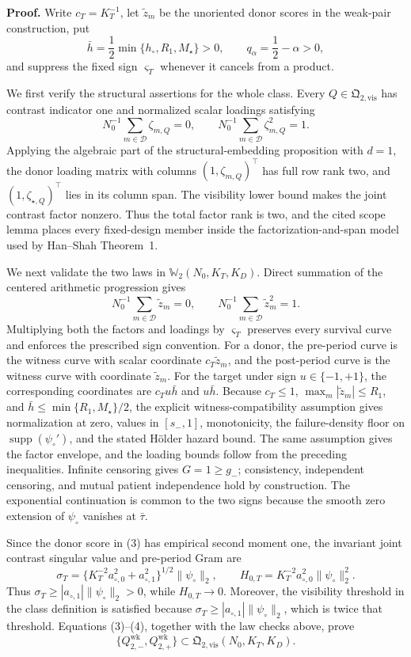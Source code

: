 \textbf{Proof.}
Write \(c_T=K_T^{-1}\), let \(\widetilde z_m\) be the unoriented donor scores in the weak-pair construction, put
\[
 \bar h=\frac12\min\{h_\circ,R_1,M_\star\}>0,
 \qquad q_\alpha=\frac12-\alpha>0,                       \tag{1}
\]
and suppress the fixed sign \(\varsigma_T\) whenever it cancels from a product.

We first verify the structural assertions for the whole class.  Every \(Q\in\mathfrak Q_{2,\mathrm{vis}}\) has contrast indicator one and normalized scalar loadings satisfying
\[
 N_0^{-1}\sum_{m\in\mathcal D}\zeta_{m,Q}=0,
 \qquad
 N_0^{-1}\sum_{m\in\mathcal D}\zeta_{m,Q}^2=1.          \tag{2}
\]
Applying the algebraic part of the structural-embedding proposition with \(d=1\), the donor loading matrix with columns \((1,\zeta_{m,Q})^\top\) has full row rank two, and \((1,\zeta_{\star,Q})^\top\) lies in its column span.  The visibility lower bound makes the joint contrast factor nonzero.  Thus the total factor rank is two, and the cited scope lemma places every fixed-design member inside the factorization-and-span model used by Han--Shah Theorem~1.

We next validate the two laws in \(\mathbb W_2(N_0,K_T,K_D)\).  Direct summation of the centered arithmetic progression gives
\[
 N_0^{-1}\sum_{m\in\mathcal D}\widetilde z_m=0,
 \qquad
 N_0^{-1}\sum_{m\in\mathcal D}\widetilde z_m^2=1.       \tag{3}
\]
Multiplying both the factors and loadings by \(\varsigma_T\) preserves every survival curve and enforces the prescribed sign convention.  For a donor, the pre-period curve is the witness curve with scalar coordinate \(c_T\widetilde z_m\), and the post-period curve is the witness curve with coordinate \(\widetilde z_m\).  For the target under sign \(u\in\{-1,+1\}\), the corresponding coordinates are \(c_Tu\bar h\) and \(u\bar h\).  Because \(c_T\le1\), \(\max_m|\widetilde z_m|\le R_1\), and \(\bar h\le\min\{R_1,M_\star\}/2\), the explicit witness-compatibility assumption gives normalization at zero, values in \([s_-,1]\), monotonicity, the failure-density floor on \(\operatorname{supp}(\psi_\circ')\), and the stated Hölder hazard bound.  The same assumption gives the factor envelope, and the loading bounds follow from the preceding inequalities.  Infinite censoring gives \(G=1\ge g_-\); consistency, independent censoring, and mutual patient independence hold by construction.  The exponential continuation is common to the two signs because the smooth zero extension of \(\psi_\circ\) vanishes at \(\bar\tau\).

Since the donor score in (3) has empirical second moment one, the invariant joint contrast singular value and pre-period Gram are
\[
 \sigma_T=\{K_T^{-2}a_{\circ,0}^2+a_{\circ,1}^2\}^{1/2}
             \|\psi_\circ\|_2,
 \qquad
 H_{0,T}=K_T^{-2}a_{\circ,0}^2\|\psi_\circ\|_2^2.       \tag{4}
\]
Thus \(\sigma_T\ge |a_{\circ,1}|\|\psi_\circ\|_2>0\), while \(H_{0,T}\to0\).  Moreover, the visibility threshold in the class definition is satisfied because \(\sigma_T\ge |a_{\circ,1}|\|\psi_\circ\|_2\), which is twice that threshold.  Equations (3)--(4), together with the law checks above, prove
\[
 \{Q_{2,-}^{\mathrm{wk}},Q_{2,+}^{\mathrm{wk}}\}
 \subset\mathfrak Q_{2,\mathrm{vis}}(N_0,K_T,K_D).       \tag{5}
\]

